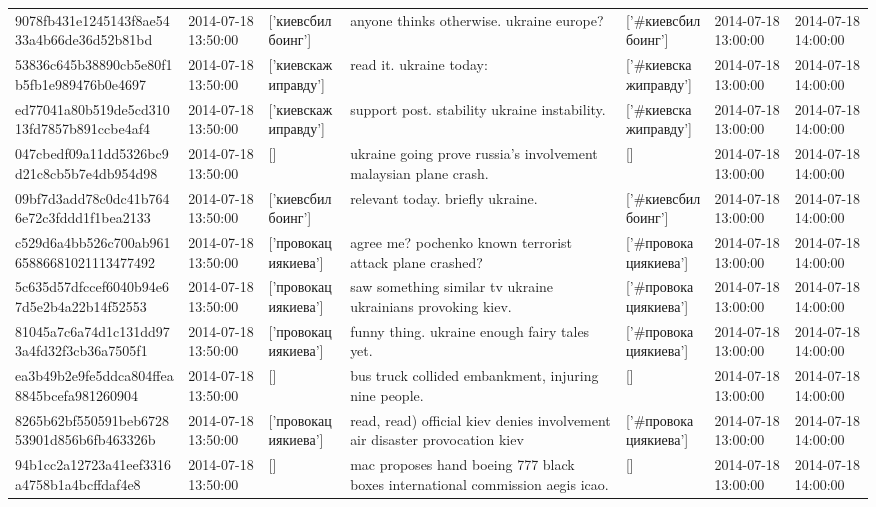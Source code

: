 \begin{tabular}{lllllll}
9078fb431e1245143f8ae5433a4b66de36d52b81bd & 2014-07-18 13:50:00 & ['киевсбилбоинг'] & anyone thinks otherwise. ukraine europe? & ['#киевсбилбоинг'] & 2014-07-18 13:00:00 & 2014-07-18 14:00:00 \\
53836c645b38890cb5e80f1b5fb1e989476b0e4697 & 2014-07-18 13:50:00 & ['киевскажиправду'] & read it. ukraine today: & ['#киевскажиправду'] & 2014-07-18 13:00:00 & 2014-07-18 14:00:00 \\
ed77041a80b519de5cd31013fd7857b891ccbe4af4 & 2014-07-18 13:50:00 & ['киевскажиправду'] & support post. stability ukraine instability. & ['#киевскажиправду'] & 2014-07-18 13:00:00 & 2014-07-18 14:00:00 \\
047cbedf09a11dd5326bc9d21c8cb5b7e4db954d98 & 2014-07-18 13:50:00 & [] & ukraine going prove russia's involvement malaysian plane crash. & [] & 2014-07-18 13:00:00 & 2014-07-18 14:00:00 \\
09bf7d3add78c0dc41b7646e72c3fddd1f1bea2133 & 2014-07-18 13:50:00 & ['киевсбилбоинг'] & relevant today. briefly ukraine. & ['#киевсбилбоинг'] & 2014-07-18 13:00:00 & 2014-07-18 14:00:00 \\
c529d6a4bb526c700ab96165886681021113477492 & 2014-07-18 13:50:00 & ['провокациякиева'] & agree me? pochenko known terrorist attack plane crashed? & ['#провокациякиева'] & 2014-07-18 13:00:00 & 2014-07-18 14:00:00 \\
5c635d57dfccef6040b94e67d5e2b4a22b14f52553 & 2014-07-18 13:50:00 & ['провокациякиева'] & saw something similar tv ukraine ukrainians provoking kiev. & ['#провокациякиева'] & 2014-07-18 13:00:00 & 2014-07-18 14:00:00 \\
81045a7c6a74d1c131dd973a4fd32f3cb36a7505f1 & 2014-07-18 13:50:00 & ['провокациякиева'] & funny thing. ukraine enough fairy tales yet. & ['#провокациякиева'] & 2014-07-18 13:00:00 & 2014-07-18 14:00:00 \\
ea3b49b2e9fe5ddca804ffea8845bcefa981260904 & 2014-07-18 13:50:00 & [] & bus truck collided embankment, injuring nine people. & [] & 2014-07-18 13:00:00 & 2014-07-18 14:00:00 \\
8265b62bf550591beb672853901d856b6fb463326b & 2014-07-18 13:50:00 & ['провокациякиева'] & read, read) official kiev denies involvement air disaster provocation kiev & ['#провокациякиева'] & 2014-07-18 13:00:00 & 2014-07-18 14:00:00 \\
94b1cc2a12723a41eef3316a4758b1a4bcffdaf4e8 & 2014-07-18 13:50:00 & [] & mac proposes hand boeing 777 black boxes international commission aegis icao. & [] & 2014-07-18 13:00:00 & 2014-07-18 14:00:00 \\

\end{tabular}

